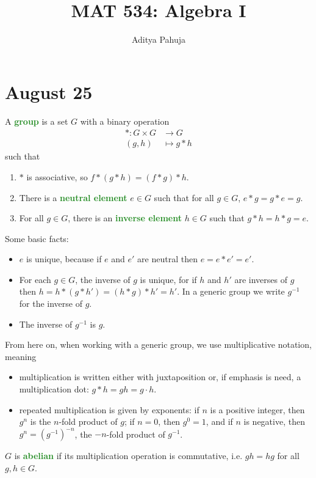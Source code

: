 \documentclass[11pt]{scrartcl}
\title{\vspace{-2em}MAT 534: Algebra I}
\author{\large Aditya Pahuja}
\date{}
\providecommand{\ii}{\item}
\providecommand{\inv}{^{-1}}
\providecommand{\vocab}[1]{{\textbf{\textcolor{ForestGreen}{#1}}}}
\begin{document}
\maketitle
\tableofcontents

\pagebreak

\section{August 25}\label{sec:aug25}

\begin{definition}[Group]
    \label{def:group}
    A \vocab{group} is a set $G$ with a binary operation
    \begin{align*}
        *\colon G\times G &\to G \\
	(g,h)&\mapsto g*h
    \end{align*}
    such that
    \begin{enumerate}[(1)]
        \ii $*$ is associative, so $f*(g*h) = (f*g)*h$.
	\ii There is a \vocab{neutral element} $e\in G$ such that
	for all $g\in G$, $e*g=g*e=g$.
	\ii For all $g\in G$, there is an \vocab{inverse element}
	$h\in G$ such that $g*h=h*g=e$.
    \end{enumerate}
\end{definition}

Some basic facts:
\begin{itemize}
    \ii $e$ is unique, because if $e$ and $e'$ are neutral
    then $e = e*e' = e'$.
    \ii For each $g\in G$, the inverse of $g$ is unique, for
    if $h$ and $h'$ are inverses of $g$ then
    $h = h*(g*h') = (h*g)*h' = h'$.
    In a generic group we write $g\inv$ for the inverse of $g$.
    \ii The inverse of $g\inv$ is $g$.
\end{itemize}

From here on, when working with a generic group,
we use multiplicative notation, meaning
\begin{itemize}
    \ii multiplication is written either with juxtaposition or,
    if emphasis is need, a multiplication dot: $g*h = gh = g\cdot h$.
    \ii repeated multiplication is given by exponents:
    if $n$ is a positive integer, then $g^n$ is the $n$-fold product of $g$;
    if $n = 0$, then $g^0 = 1$, and if $n$ is negative, then
    $g^n = (g\inv)^{-n}$, the $-n$-fold product of $g\inv$.
\end{itemize}

\begin{definition}
    \label{def:abeliangroup}
    $G$ is \vocab{abelian} if its multiplication operation is commutative,
    i.e. $gh = hg$ for all $g,h\in G$.
\end{definition}
\end{document}
